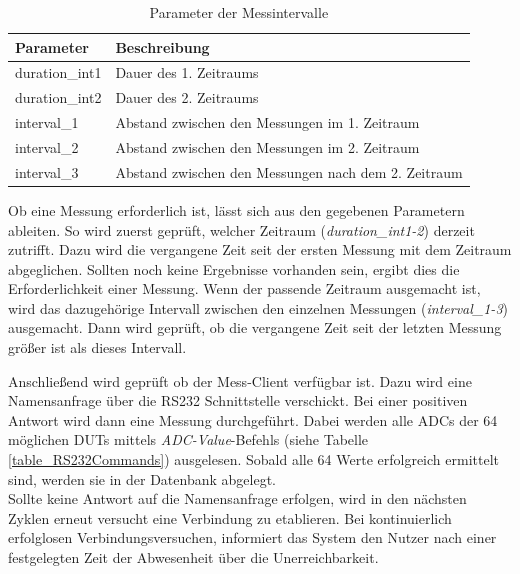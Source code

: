 \begin{table}[H]
\begin{center}
\begin{tabular}{|l|l|}\hline
Parameter & Beschreibung \\ \hline
duration\_int1 & Dauer des 1. Zeitraums\\  \hline
duration\_int2 & Dauer des 2. Zeitraums\\  \hline
interval\_1 & Abstand zwischen den Messungen im 1. Zeitraum\\  \hline
interval\_2 & Abstand zwischen den Messungen im 2. Zeitraum\\  \hline
interval\_3 & Abstand zwischen den Messungen nach dem 2. Zeitraum\\ \hline
\end{tabular}
\caption{Parameter der Messintervalle}
\label{table_ParameterMessintervalle}
\end{center}
\end{table}


Ob eine Messung erforderlich ist, lässt sich aus den gegebenen Parametern ableiten. So wird zuerst geprüft, welcher Zeitraum (\textit{duration\_int1-2}) derzeit zutrifft. Dazu wird die vergangene Zeit seit der ersten Messung mit dem Zeitraum abgeglichen. Sollten noch keine Ergebnisse vorhanden sein, ergibt dies die Erforderlichkeit einer Messung. Wenn der passende Zeitraum ausgemacht ist, wird das dazugehörige Intervall zwischen den einzelnen Messungen (\textit{interval\_1-3}) ausgemacht. Dann wird geprüft, ob die vergangene Zeit seit der letzten Messung größer ist als dieses Intervall.\ 

Anschließend wird geprüft ob der Mess-Client verfügbar ist. Dazu wird eine Namensanfrage über die RS232 Schnittstelle verschickt. Bei einer positiven Antwort wird dann eine Messung durchgeführt. Dabei werden alle \acp{ADC} der 64 möglichen \acp{DUT} mittels \textit{ADC-Value}-Befehls (siehe Tabelle \ref{table_RS232Commands}) ausgelesen. Sobald alle 64 Werte erfolgreich ermittelt sind, werden sie in der Datenbank abgelegt. \\
Sollte keine Antwort auf die Namensanfrage erfolgen, wird in den nächsten Zyklen erneut versucht eine Verbindung zu etablieren. Bei kontinuierlich erfolglosen Verbindungsversuchen, informiert das System den Nutzer nach einer festgelegten Zeit der Abwesenheit über die Unerreichbarkeit.
 
